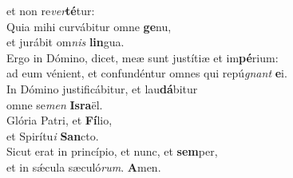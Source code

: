 \oddverse et non re\textit{ver}\textbf{té}tur:\\
\evenverse Quia mihi curvábitur omne \textbf{ge}nu,~\*\\
\evenverse et jurábit om\textit{nis} \textbf{lin}gua.\\
\oddverse Ergo in Dómino, dicet, meæ sunt justítiæ et im\textbf{pé}rium:~\*\\
\oddverse ad eum vénient, et confundéntur omnes qui repú\textit{gnant} \textbf{e}i.\\
\evenverse In Dómino justificábitur, et lau\textbf{dá}bitur~\*\\
\evenverse omne se\textit{men} \textbf{Is}\textbf{ra}ël.\\
\oddverse Glória Patri, et \textbf{Fí}lio,~\*\\
\oddverse et Spirítu\textit{i} \textbf{San}cto.\\
\evenverse Sicut erat in princípio, et nunc, et \textbf{sem}per,~\*\\
\evenverse et in sǽcula sæculó\textit{rum}. \textbf{A}men.\\
